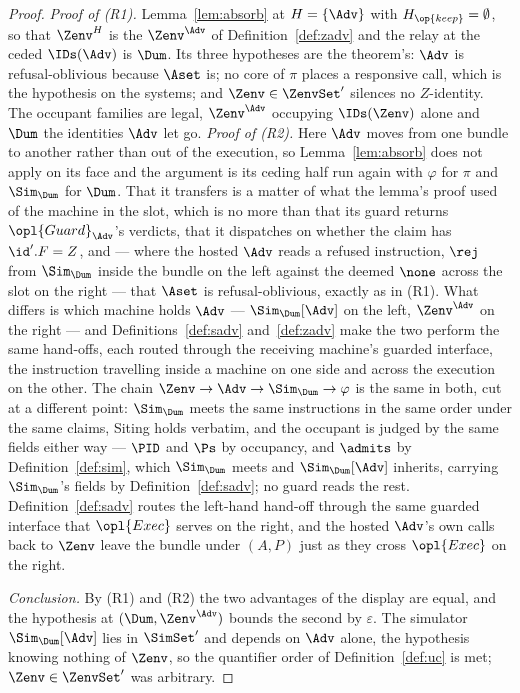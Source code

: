 \documentclass[10pt,oneside,openany]{book}
\theoremstyle{accentdef}
\theoremstyle{accentplain}
\begin{document}
\begin{proof}
\emph{Proof of \textnormal{(R1)}.} Lemma~\ref{lem:absorb} at $H = \{\Adv\}$ with
$H_{\op{keep}} = \emptyset$, so that $\Zenv^{H}$ is the $\Zenv^{\Adv}$ of
Definition~\ref{def:zadv} and the relay at the ceded $\IDs(\Adv)$ is $\Dum$. Its three hypotheses are
the theorem's: $\Adv$ is refusal-oblivious because $\Aset$ is; no core of $\pi$ places a responsive
call, which is the hypothesis on the systems; and $\Zenv \in \ZenvSet'$ silences no $Z$-identity.
The occupant families are legal, $\Zenv^{\Adv}$ occupying $\IDs(\Zenv)$ alone and $\Dum$ the
identities $\Adv$ let go.
\emph{Proof of \textnormal{(R2)}.} Here $\Adv$ moves from one bundle to another rather than out of the
execution, so Lemma~\ref{lem:absorb} does not apply on its face and the argument is its ceding half
run again with $\varphi$ for $\pi$ and $\Sim_{\Dum}$ for $\Dum$. That it transfers is a matter of
what the lemma's proof used of the machine in the slot, which is no more than that its guard returns
$\opl{Guard}_{\Adv}$'s verdicts, that it dispatches on whether the claim has $\id'.F = Z$, and ---
where the hosted $\Adv$ reads a refused instruction, $\rej$ from $\Sim_{\Dum}$ inside the bundle
on the left against the deemed $\none$ across the slot on the right --- that $\Aset$ is
refusal-oblivious, exactly as in (R1).
What differs is which machine holds $\Adv$ --- $\Sim_{\Dum}[\Adv]$ on the left, $\Zenv^{\Adv}$ on
the right --- and Definitions~\ref{def:sadv} and~\ref{def:zadv} make the two perform the same
hand-offs, each routed through the receiving machine's guarded interface, the instruction
travelling inside a machine on one side and across the execution
on the other. The chain $\Zenv \to \Adv \to \Sim_{\Dum} \to \varphi$ is the same in both, cut at
a different point: $\Sim_{\Dum}$ meets the same instructions in the same order under the same
claims, Siting holds verbatim, and the occupant is judged by the same fields either way ---
$\PID$ and $\Ps$ by occupancy, and $\admits$ by Definition~\ref{def:sim}, which $\Sim_{\Dum}$
meets and $\Sim_{\Dum}[\Adv]$ inherits, carrying $\Sim_{\Dum}$'s fields by
Definition~\ref{def:sadv}; no guard reads the rest.
Definition~\ref{def:sadv} routes the left-hand hand-off through the same guarded interface that
$\opl{Exec}$ serves on the right, and the hosted $\Adv$'s own calls back to $\Zenv$ leave the
bundle under $(A,P)$ just as they cross $\opl{Exec}$ on the right.

\emph{Conclusion.} By (R1) and (R2) the two advantages of the display are equal, and the
hypothesis at $(\Dum,\Zenv^{\Adv})$ bounds the second by $\varepsilon$. The simulator $\Sim_{\Dum}[\Adv]$ lies
in $\SimSet'$ and depends on $\Adv$ alone, the hypothesis knowing nothing of $\Zenv$, so the
quantifier order of Definition~\ref{def:uc} is met; $\Zenv \in \ZenvSet'$ was arbitrary.
\end{proof}
\end{document}
